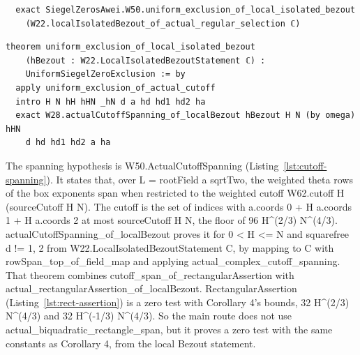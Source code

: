 \begin{listing}[tbp]
\caption{The main route: OAI/\allowbreak NumberTheory/\allowbreak SiegelZeros/\allowbreak Conclusions/\allowbreak Theorem.lean:18-19 and Intersection/BezoutBoundary.lean:13-19 (openai/math fd4aeeb).}\label{lst:main-route} %
\begin{Verbatim}
  exact SiegelZerosAwei.W50.uniform_exclusion_of_local_isolated_bezout
    (W22.localIsolatedBezout_of_actual_regular_selection ℂ)
\end{Verbatim}
\begin{Verbatim}
theorem uniform_exclusion_of_local_isolated_bezout
    (hBezout : W22.LocalIsolatedBezoutStatement ℂ) :
    UniformSiegelZeroExclusion := by
  apply uniform_exclusion_of_actual_cutoff
  intro H N hH hHN _hN d a hd hd1 hd2 ha
  exact W28.actualCutoffSpanning_of_localBezout hBezout H N (by omega) hHN
    d hd hd1 hd2 a ha
\end{Verbatim}
\end{listing}

The spanning hypothesis is W50.ActualCutoffSpanning (Listing~\ref{lst:cutoff-spanning}). %
It states that, over L = rootField a sqrtTwo, the weighted theta rows of the box exponents span when restricted to the weighted cutoff W62.cutoff H (sourceCutoff H N). %
The cutoff is the set of indices with a.coords 0 + H a.coords 1 + H a.coords 2 at most sourceCutoff H N, the floor of 96 H\textasciicircum(2/3) N\textasciicircum(4/3). %
actualCutoffSpanning\_of\_localBezout proves it for 0 < H <= N and squarefree d != 1, 2 from W22.LocalIsolatedBezoutStatement C, by mapping to C with rowSpan\_top\_of\_field\_map and applying actual\_complex\_cutoff\_spanning. %
That theorem combines cutoff\_span\_of\_rectangularAssertion with actual\_rectangularAssertion\_of\_localBezout. %
RectangularAssertion (Listing~\ref{lst:rect-assertion}) is a zero test with Corollary 4's bounds, 32 H\textasciicircum(2/3) N\textasciicircum(4/3) and 32 H\textasciicircum(-1/3) N\textasciicircum(4/3). %
So the main route does not use actual\_biquadratic\_rectangle\_span, but it proves a zero test with the same constants as Corollary 4, from the local Bezout statement. %

